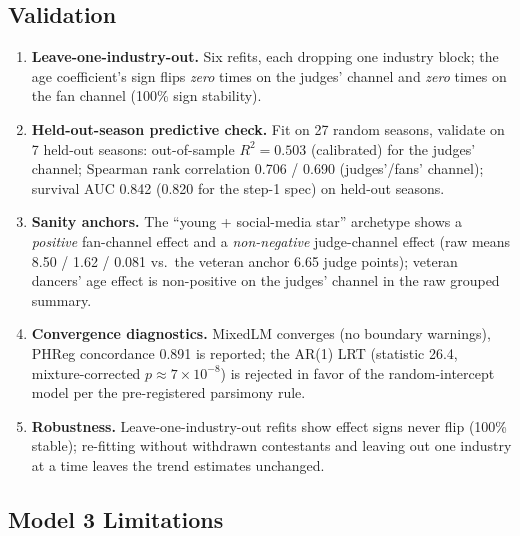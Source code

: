 \documentclass[10pt]{article}
\begin{document}
\subsection{Validation}
\label{sec:m3valid}

\begin{enumerate}[itemsep=1pt]
\item \textbf{Leave-one-industry-out.} Six refits, each dropping one industry block; the
age coefficient's sign flips \emph{zero} times on the judges' channel and \emph{zero} times
on the fan channel (100\% sign stability).
\item \textbf{Held-out-season predictive check.} Fit on 27 random seasons, validate on 7
held-out seasons: out-of-sample $R^2 = 0.503$ (calibrated) for the judges' channel;
Spearman rank correlation 0.706 / 0.690 (judges'/fans' channel); survival AUC 0.842
(0.820 for the step-1 spec) on held-out seasons.
\item \textbf{Sanity anchors.} The ``young + social-media star'' archetype shows a
\emph{positive} fan-channel effect and a \emph{non-negative} judge-channel effect
(raw means 8.50 / 1.62 / 0.081 vs.\ the veteran anchor 6.65 judge points); veteran dancers'
age effect is non-positive on the judges' channel in the raw grouped summary.
\item \textbf{Convergence diagnostics.} MixedLM converges (no boundary warnings), PHReg
concordance 0.891 is reported; the AR(1) LRT (statistic 26.4, mixture-corrected
$p \approx 7 \times 10^{-8}$) is rejected in favor of the random-intercept model per
the pre-registered parsimony rule.
\item \textbf{Robustness.} Leave-one-industry-out refits show effect signs never flip
(100\% stable); re-fitting without withdrawn contestants and leaving out one industry at a
time leaves the trend estimates unchanged.
\end{enumerate}

\subsection{Model 3 Limitations}
\end{document}
